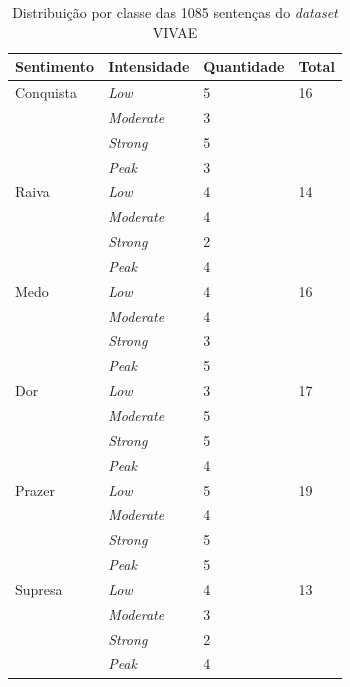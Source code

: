 \begin{table}[]
    \centering
    \caption{Distribuição por classe das 1085 sentenças do \textit{dataset} \acrshort{VIVAE}}
    \begin{tabular}{|l|l|l|l|}
    \hline
        Sentimento & Intensidade & Quantidade & Total \\ \hline
        Conquista & \textit{Low} & 5 & 16 \\ \hline
        ~ & \textit{Moderate} & 3 & ~ \\ \hline
        ~ & \textit{Strong} & 5 & ~ \\ \hline
        ~ & \textit{Peak} & 3 & ~ \\ \hline
        Raiva & \textit{Low} & 4 & 14 \\ \hline
        ~ & \textit{Moderate} & 4 & ~ \\ \hline
        ~ & \textit{Strong} & 2 & ~ \\ \hline
        ~ & \textit{Peak} & 4 & ~ \\ \hline
        Medo & \textit{Low} & 4 & 16 \\ \hline
        ~ & \textit{Moderate} & 4 & ~ \\ \hline
        ~ & \textit{Strong} & 3 & ~ \\ \hline
        ~ & \textit{Peak} & 5 & ~ \\ \hline
        Dor & \textit{Low} & 3 & 17 \\ \hline
        ~ & \textit{Moderate} & 5 & ~ \\ \hline
        ~ & \textit{Strong} & 5 & ~ \\ \hline
        ~ & \textit{Peak} & 4 & ~ \\ \hline
        Prazer & \textit{Low} & 5 & 19 \\ \hline
        ~ & \textit{Moderate} & 4 & ~ \\ \hline
        ~ & \textit{Strong} & 5 & ~ \\ \hline
        ~ & \textit{Peak} & 5 & ~ \\ \hline
        Supresa & \textit{Low} & 4 & 13 \\ \hline
        ~ & \textit{Moderate} & 3 & ~ \\ \hline
        ~ & \textit{Strong} & 2 & ~ \\ \hline
        ~ & \textit{Peak} & 4 \\ \hline
    \end{tabular}\label{table:vivae}
\end{table}

